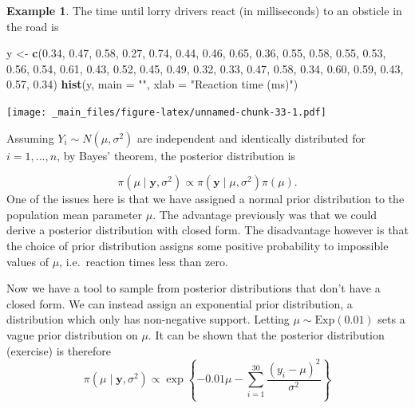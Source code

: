 \documentclass[
]{book}
\newenvironment{Shaded}{\begin{snugshade}}{\end{snugshade}}
\newcommand{\AttributeTok}[1]{\textcolor[rgb]{0.13,0.29,0.53}{#1}}
\newcommand{\FloatTok}[1]{\textcolor[rgb]{0.00,0.00,0.81}{#1}}
\newcommand{\FunctionTok}[1]{\textcolor[rgb]{0.13,0.29,0.53}{\textbf{#1}}}
\newcommand{\NormalTok}[1]{#1}
\newcommand{\OtherTok}[1]{\textcolor[rgb]{0.56,0.35,0.01}{#1}}
\newcommand{\StringTok}[1]{\textcolor[rgb]{0.31,0.60,0.02}{#1}}
\theoremstyle{definition}
\theoremstyle{definition}
\newtheorem{example}{Example}[chapter]
\theoremstyle{definition}
\theoremstyle{definition}
\theoremstyle{remark}
\begin{document}
\begin{example}
\protect\hypertarget{exm:norm}{}\label{exm:norm}The time until lorry drivers react (in milliseconds) to an obsticle in the road is

\begin{Shaded}
\begin{Highlighting}[]
\NormalTok{y }\OtherTok{\textless{}{-}} \FunctionTok{c}\NormalTok{(}\FloatTok{0.34}\NormalTok{, }\FloatTok{0.47}\NormalTok{, }\FloatTok{0.58}\NormalTok{, }\FloatTok{0.27}\NormalTok{, }\FloatTok{0.74}\NormalTok{, }\FloatTok{0.44}\NormalTok{, }\FloatTok{0.46}\NormalTok{, }\FloatTok{0.65}\NormalTok{, }\FloatTok{0.36}\NormalTok{, }\FloatTok{0.55}\NormalTok{, }\FloatTok{0.58}\NormalTok{, }\FloatTok{0.55}\NormalTok{, }
       \FloatTok{0.53}\NormalTok{, }\FloatTok{0.56}\NormalTok{, }\FloatTok{0.54}\NormalTok{, }\FloatTok{0.61}\NormalTok{, }\FloatTok{0.43}\NormalTok{, }\FloatTok{0.52}\NormalTok{, }\FloatTok{0.45}\NormalTok{, }\FloatTok{0.49}\NormalTok{, }\FloatTok{0.32}\NormalTok{, }\FloatTok{0.33}\NormalTok{, }\FloatTok{0.47}\NormalTok{, }\FloatTok{0.58}\NormalTok{, }
       \FloatTok{0.34}\NormalTok{, }\FloatTok{0.60}\NormalTok{, }\FloatTok{0.59}\NormalTok{, }\FloatTok{0.43}\NormalTok{, }\FloatTok{0.57}\NormalTok{, }\FloatTok{0.34}\NormalTok{)}
\FunctionTok{hist}\NormalTok{(y, }\AttributeTok{main =} \StringTok{""}\NormalTok{, }\AttributeTok{xlab =} \StringTok{"Reaction time (ms)"}\NormalTok{)}
\end{Highlighting}
\end{Shaded}

\texttt{[image: \_main\_files/figure-latex/unnamed-chunk-33-1.pdf]}

Assuming \(Y_i \sim N(\mu, \sigma^2)\) are independent and identically distributed for \(i=1,...,n\), by Bayes' theorem, the posterior distribution is

\[
\pi(\mu \mid \boldsymbol{y}, \sigma^2) \propto \pi(\boldsymbol{y} \mid \mu, \sigma^2) \pi(\mu).
\]
One of the issues here is that we have assigned a normal prior distribution to the population mean parameter \(\mu\). The advantage previously was that we could derive a posterior distribution with closed form. The disadvantage however is that the choice of prior distribution assigns some positive probability to impossible values of \(\mu\), i.e.~reaction times less than zero.

Now we have a tool to sample from posterior distributions that don't have a closed form. We can instead assign an exponential prior distribution, a distribution which only has non-negative support. Letting \(\mu \sim \textrm{Exp}(0.01)\) sets a vague prior distribution on \(\mu\). It can be shown that the posterior distribution (exercise) is therefore
\[
\pi(\mu \mid \boldsymbol{y}, \sigma^2) \propto \exp\left\{-0.01\mu -\sum_{i=1}^{30}\frac{(y_i - \mu)^2}{\sigma^2}\right\} 
\]


\end{example}
\end{document}
